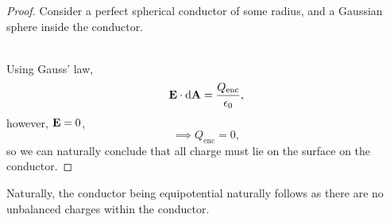 \documentclass{book}
\begin{document}
\begin{proof}
    Consider a perfect spherical conductor of some radius, and a Gaussian sphere inside the conductor.  
    \begin{figure}
        \centering
        \caption{}
        \label{fig:equipotential}
    \end{figure}
    \\
    Using Gauss' law,
    \begin{equation*}
        \vb{E}\cdot\dd{\vb{A}} = \frac{Q_{\text{enc}}}{\epsilon_0},
    \end{equation*}
    however, $\vb{E} = 0$,
    $$\implies Q_{\text{enc}} = 0,$$
    so we can naturally conclude that all charge must lie on the surface on the conductor.
\end{proof}\noindent
Naturally, the conductor being equipotential naturally follows as there are no unbalanced charges within the conductor.
\end{document}
